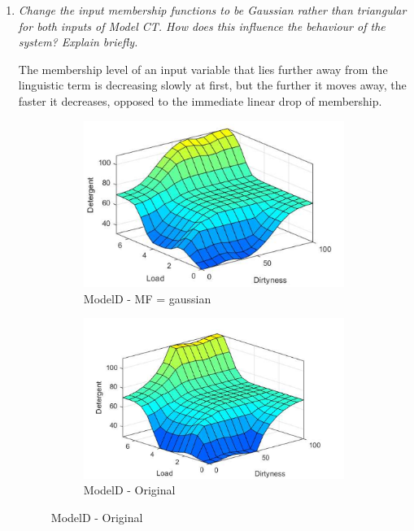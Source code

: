 \documentclass[11pt]{article}
\begin{document}
\begin{enumerate}[label=(\alph*)]
  \item \textit{Change the input membership functions to be Gaussian rather than
  triangular for both inputs of Model CT. How does this influence the behaviour
  of the system? Explain briefly.}

  The membership level of an input variable that lies further away from the
  linguistic term is decreasing slowly at first, but the further it moves away,
  the faster it decreases, opposed to the immediate linear drop of membership.

  \begin{figure}[ht!]
  \centering
  \begin{subfigure}{.5\textwidth}
    \centering
    \includegraphics[width=.9\linewidth]{res/modelD_gaussian}
    \caption{ModelD - MF = gaussian}
    \label{fig:sub1}
  \end{subfigure}%
  \begin{subfigure}{.5\textwidth}
    \centering
    \includegraphics[width=.9\linewidth]{res/image2}
    \caption{ModelD - Original}
    \label{fig:sub2}
  \end{subfigure}
  \end{figure}

\end{enumerate}
\end{document}
